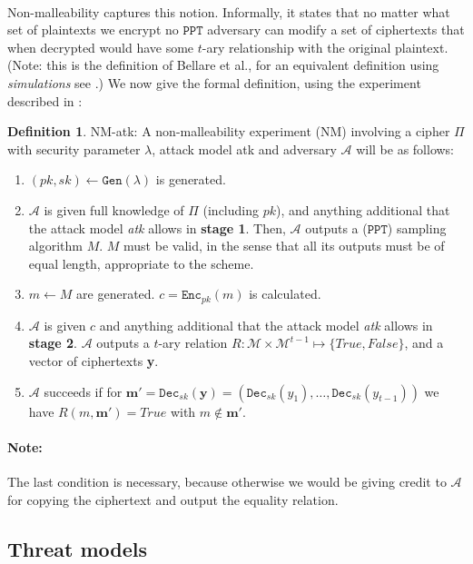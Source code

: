 \documentclass{article}
\theoremstyle{definition}
\newtheorem{definition}{Definition}[section]
\newcommand{\Enc}{\texttt{Enc}}
\newcommand{\Dec}{\texttt{Dec}}
\newcommand{\Gen}{\texttt{Gen}}
\newcommand{\M}{\mathcal{M}}
\newcommand{\A}{\mathcal{A}}
\newcommand{\PPT}{\texttt{PPT}}
\begin{document}
\paragraph{} Non-malleability captures this notion. Informally, it states that
no matter what set of plaintexts we encrypt no $\PPT$ adversary can modify a set
of ciphertexts that when decrypted would have some $t$-ary relationship with the
original plaintext. (Note: this is the definition of Bellare et al., for an
equivalent definition using \textit{simulations} see
\cite{dolev2003nonmalleable}.) We now give the formal definition, using the
experiment described in \cite{bellaresecurityrelations}:
\begin{definition}{NM-atk:}
  A non-malleability experiment (NM) involving a cipher $\Pi$ with security
  parameter $\lambda$, attack model atk and adversary $\A$ will be as follows:
  \begin{enumerate}
    \item $(pk, sk) \leftarrow \Gen(\lambda)$ is generated.
    \item $\A$ is given full knowledge of $\Pi$ (including $pk$), and anything additional that
      the attack model \textit{atk} allows in \textbf{stage 1}. Then, $\A$
      outputs a ($\PPT$) sampling algorithm $M$. $M$ must be valid, in the sense
      that all its outputs must be of equal length, appropriate to the scheme.
    \item $m \leftarrow M$ are generated. $c = \Enc_{pk}(m)$ is calculated.
    \item $\A$ is given $c$ and anything additional that the attack model
      \textit{atk} allows in \textbf{stage 2}. $\A$ outputs a $t$-ary relation
      $R:\M \times \M^{t-1} \mapsto \{True, False\}$, and a vector of
      ciphertexts \textbf{y}.
    \item $\A$ succeeds if for $\textbf{m}' = \Dec_{sk}(\textbf{y}) = (\Dec_{sk}(y_1),
      \hdots,\Dec_{sk}(y_{t-1}))$ we have $R(m, \textbf{m}') = True$ with $m
      \not\in \textbf{m}'$.
  \end{enumerate}
  \paragraph{Note:} The last condition is necessary, because otherwise we would
  be giving credit to $\A$ for copying the ciphertext and output the equality relation.
\end{definition}
\subsection{Threat models}
\end{document}
